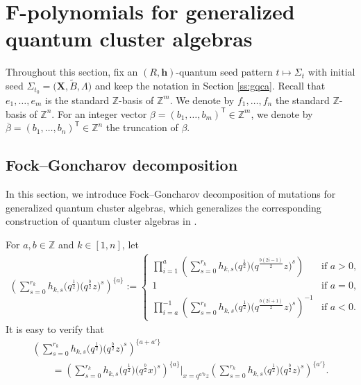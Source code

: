\documentclass[11pt]{article}
\numberwithin{equation}{section}
\newcommand{\Z}{\mathbb{Z}}
\numberwithin{equation}{section}
\begin{document}
\section[F-polynomials for generalized quantum cluster algebras]{$\boldsymbol{F}$-polynomials for generalized quantum cluster algebras}

Throughout this section, fix an $(R,\mathbf{h})$-quantum seed pattern $t\mapsto \Sigma_t$ with initial seed $\Sigma_{t_0}=\bigl(\mathbf{X},\tilde{B},\Lambda\bigr)$ and keep the notation in Section \ref{ss:gqca}. Recall that $e_1,\dots, e_m$ is the standard $\mathbb{Z}$-basis of $\mathbb{Z}^m$. We denote by $f_1,\dots, f_n$ the standard $\mathbb{Z}$-basis of $\mathbb{Z}^n$.
For an integer vector $\beta=(b_1,\dots, b_m)^{\mathsf T}\in \Z^m$, we denote by $\overline{\beta}=(b_1,\dots, b_n)^{\mathsf T}\in \Z^n$ the truncation of $\beta$.
\subsection{Fock--Goncharov decomposition}\label{s:FG-decom-GQCA}
In this section, we introduce Fock--Goncharov decomposition of mutations for generalized quantum cluster algebras, which generalizes the corresponding construction of quantum cluster algebras in \cite{fock2009,Keller2012}.


For $a,b\in\mathbb{Z}$ and $k\in[1,n]$, let
\begin{align*}
 \left(\sum\limits^{r_{k}}_{s=0}h_{k,s}\bigl(q^{\frac{1}{2}}\bigr)\bigl(q^{\frac{b}{2}}z\bigr)^{s}\right)^{\{a\}}:=
 \begin{cases}\displaystyle\prod\limits_{i=1}^{a}
 \left(\sum\limits^{r_{k}}_{s=0}h_{k,s}\bigl(q^{\frac{1}{2}}\bigr)\bigl(q^{\frac{b(2i-1)}{2}}z\bigr)^{s}\right)&\text{if } a>0,\\
 1&\text{if }a=0,\\
 \displaystyle \prod\limits_{i=a}^{-1}\left(\sum\limits^{r_{k}}_{s=0}h_{k,s}\bigl(q^{\frac{1}{2}}\bigr)\bigl(q^{\frac{b(2i+1)}{2}}z\bigr)^{s}\right)^{-1}&\text{if } a<0.
 \end{cases}
\end{align*}
It is easy to verify that
\begin{gather}
 \left(\sum\limits^{r_{k}}_{s=0}h_{k,s}\bigl(q^{\frac{1}{2}}\bigr)\bigl(q^{\frac{b}{2}}z\bigr)^{s}\right)^{\{a+a'\}}\nonumber\\
 \qquad=\left(\sum\limits^{r_{k}}_{s=0}h_{k,s}\bigl(q^{\frac{1}{2}}\bigr)\bigl(q^{\frac{b}{2}}x\bigr)^{s}\right)^{\{a\}}\bigg|_{x=q^{a'b}z}
 \left(\sum\limits^{r_{k}}_{s=0}h_{k,s}\bigl(q^{\frac{1}{2}}\bigr)\bigl(q^{\frac{b}{2}}z\bigr)^{s}\right)^{\{a'\}}.\label{eq:FG-decom}
\end{gather}
\end{document}
